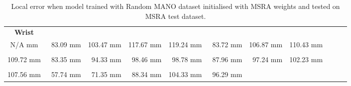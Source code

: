     \begin{table}[!ht]
    \begin{tabular}{|c|c|c|c|c|c|c|c|c|c|c|}
    \hline
    {\bfseries Wrist} & \cellcolor[HTML]{ff2500}{\bfseries IMCP} & \cellcolor[HTML]{ff0000}{\bfseries IPIP} & \cellcolor[HTML]{ff0000}{\bfseries IDIP} & \cellcolor[HTML]{ff0000}{\bfseries ITIP} & \cellcolor[HTML]{ff2500}{\bfseries MMCP} & \cellcolor[HTML]{ff0000}{\bfseries MPIP} & \cellcolor[HTML]{ff0000}{\bfseries MDIP}  \\
    N/A mm & \cellcolor[HTML]{ff2500}$\,\,\,$83.09 mm & \cellcolor[HTML]{ff0000}103.47 mm & \cellcolor[HTML]{ff0000}117.67 mm & \cellcolor[HTML]{ff0000}119.24 mm & \cellcolor[HTML]{ff2500}$\,\,\,$83.72 mm & \cellcolor[HTML]{ff0000}106.87 mm & \cellcolor[HTML]{ff0000}110.43 mm\\
    \hline
    \cellcolor[HTML]{ff0000}{\bfseries MTIP} & \cellcolor[HTML]{ff2500}{\bfseries RMCP} & \cellcolor[HTML]{ff0000}{\bfseries RPIP} & \cellcolor[HTML]{ff0000}{\bfseries RDIP} & \cellcolor[HTML]{ff0000}{\bfseries RTIP} & \cellcolor[HTML]{ff2500}{\bfseries PMCP} & \cellcolor[HTML]{ff0000}{\bfseries PPIP} & \cellcolor[HTML]{ff0000}{\bfseries PDIP}  \\
    \cellcolor[HTML]{ff0000}109.72 mm & \cellcolor[HTML]{ff2500}$\,\,\,$83.35 mm & \cellcolor[HTML]{ff0000}$\,\,\,$94.33 mm & \cellcolor[HTML]{ff0000}$\,\,\,$98.46 mm & \cellcolor[HTML]{ff0000}$\,\,\,$98.78 mm & \cellcolor[HTML]{ff2500}$\,\,\,$87.96 mm & \cellcolor[HTML]{ff0000}$\,\,\,$97.24 mm & \cellcolor[HTML]{ff0000}102.23 mm\\
    \hline
    \cellcolor[HTML]{ff0000}{\bfseries PTIP} & \cellcolor[HTML]{ffbf00}{\bfseries TMCP} & \cellcolor[HTML]{ff7500}{\bfseries TPIP} & \cellcolor[HTML]{ff2500}{\bfseries PDIP} & \cellcolor[HTML]{ff0000}{\bfseries TTIP} & \cellcolor[HTML]{ff0000}{\bfseries Average}  \\
    \cellcolor[HTML]{ff0000}107.56 mm & \cellcolor[HTML]{ffbf00}$\,\,\,$57.74 mm & \cellcolor[HTML]{ff7500}$\,\,\,$71.35 mm & \cellcolor[HTML]{ff2500}$\,\,\,$88.34 mm & \cellcolor[HTML]{ff0000}104.33 mm & \cellcolor[HTML]{ff0000}$\,\,\,$96.29 mm \\
    \cline{1-6}
    \end{tabular}
    \caption{Local error when model trained with Random MANO dataset initialised with MSRA weights and tested on MSRA test dataset.}
    \label{tb:omal}
    \end{table}